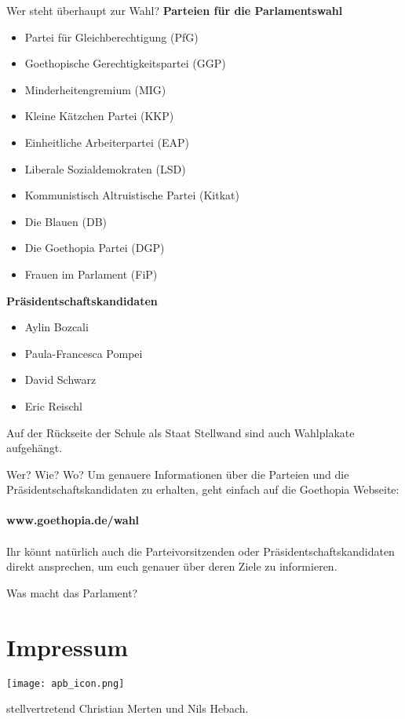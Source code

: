 \documentclass{sasbase}
\begin{document}
\begin{question}{Wer steht überhaupt zur Wahl?}
    \textbf{Parteien für die Parlamentswahl}
    \begin{itemize}
        \item Partei für Gleichberechtigung (PfG)
        \item Goethopische Gerechtigkeitspartei (GGP)
        \item Minderheitengremium (MIG)
        \item Kleine Kätzchen Partei (KKP)
        \item Einheitliche Arbeiterpartei (EAP)
        \item Liberale Sozialdemokraten (LSD)
        \item Kommunistisch Altruistische Partei (Kitkat)
        \item Die Blauen (DB)
        \item Die Goethopia Partei (DGP)
        \item Frauen im Parlament (FiP)
    \end{itemize}

    \newpage
    \textbf{Präsidentschaftskandidaten}
    \begin{itemize}
        \item Aylin Bozcali
        \item Paula-Francesca Pompei
        \item David Schwarz
        \item Eric Reischl
    \end{itemize}

    Auf der Rückseite der Schule als Staat Stellwand sind auch Wahlplakate aufgehängt.
\end{question}

\begin{question}{Wer? Wie? Wo?}
    Um genauere Informationen über die Parteien und die Präsidentschaftskandidaten zu erhalten,
    geht einfach auf die Goethopia Webseite:
    \\\\
    \noindent\textbf{www.goethopia.de/wahl}
    \\\\
    Ihr könnt natürlich auch die Parteivorsitzenden oder Präsidentschaftskandidaten direkt
    ansprechen, um euch genauer über deren Ziele zu informieren.
\end{question}

\begin{question}{Was macht das Parlament?}
\end{question}


\section{Impressum}
\begin{minipage}{0.4\linewidth}
\texttt{[image: apb\_icon.png]}
\end{minipage}
\begin{minipage}{0.5\linewidth}
{\raggedright stellvertretend Christian Merten und Nils Hebach.}
\end{minipage}
\end{document}
